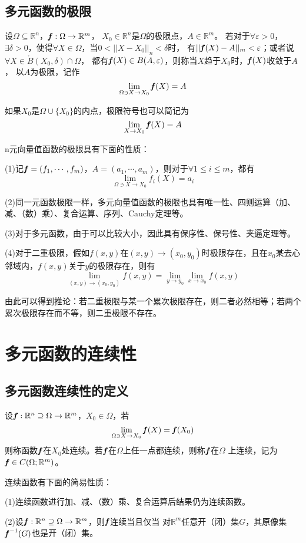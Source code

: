 \documentclass[UTF8,openany]{book}
\begin{document}
	\subsection{多元函数的极限}
	\par 设$\Omega\subseteq\mathbb{R}^n$，$\textbf{\textit{f}}:\Omega\rightarrow\mathbb{R}^m$，
	$X_0\in\mathbb{R}^n$是$\Omega$的极限点，$A\in\mathbb{R}^m$。
	若对于$\forall\varepsilon>0$，$\exists\delta>0$，使得$\forall X\in\Omega$，当$0<||X-X_0||_n<\delta$时，
	有$||\textbf{\textit{f}}(X)-A||_m<\varepsilon$；或者说$\forall X\in\mathring{B}(X_0,\delta)\cap\Omega$，
	都有$\textbf{\textit{f}}(X)\in B(A,\varepsilon)$，则称当$X$趋于$X_0$时，$\textbf{\textit{f}}(X)$收敛于$A$，
	以$A$为极限，记作
	$$\lim_{\Omega\ni X\rightarrow X_0}\textbf{\textit{f}}(X)=A$$
	\par 如果$X_0$是$\Omega\cup\{X_0\}$的内点，极限符号也可以简记为
	$$\lim_{X\rightarrow X_0}\textbf{\textit{f}}(X)=A$$
	\par n元向量值函数的极限具有下面的性质：
	\par (1)记$\textbf{\textit{f}}=(f_1,\cdots,f_m)$，$A=(a_1,\cdots,a_m)$，则对于$\forall 1\leqslant i\leqslant m$，都有
	$$\lim_{\Omega\ni X\rightarrow X_0}f_i(X)=a_i$$
	\par (2)同一元函数极限一样，多元向量值函数的极限也具有唯一性、四则运算（加、减、（数）乘）、复合运算、序列、Cauchy定理等。
	\par (3)对于多元函数，由于可以比较大小，因此具有保序性、保号性、夹逼定理等。
	\par (4)对于二重极限，假如$f(x,y)$在$(x,y)\rightarrow(x_0,y_0)$时极限存在，且在$x_0$某去心邻域内，$f(x,y)$关于$y$的极限存在，则有
	$$\lim_{(x,y)\rightarrow(x_0,y_0)}f(x,y)=\lim_{y\rightarrow y_0}\lim_{x\rightarrow x_0}f(x,y)$$
	\par 由此可以得到推论：若二重极限与某一个累次极限存在，则二者必然相等；若两个累次极限存在而不等，则二重极限不存在。
	\section{多元函数的连续性}
	\subsection{多元函数连续性的定义}
	\par 设$\textbf{\textit{f}}:\mathbb{R}^n\supseteq\Omega\rightarrow\mathbb{R}^m$，$X_0\in\Omega$，若
	$$\lim_{\Omega\ni X\rightarrow X_0}\textbf{\textit{f}}(X)=\textbf{\textit{{f}}}(X_0)$$
	则称函数$\textbf{\textit{f}}$在$X_0$处连续。若$\textbf{\textit{f}}$在$\Omega$上任一点都连续，则称$\textbf{\textit{f}}$在$\Omega$
	上连续，记为$\textbf{\textit{f}}\in C(\Omega;\mathbb{R}^m)$。
	\par 连续函数有下面的简易性质：
	\par (1)连续函数进行加、减、（数）乘、复合运算后结果仍为连续函数。
	\par (2)设$\textbf{\textit{f}}:\mathbb{R}^n\supseteq\Omega\rightarrow\mathbb{R}^m$，则$\textbf{\textit{f}}$连续当且仅当
	对$\mathbb{R}^m$任意开（闭）集$G$，其原像集$\textbf{\textit{f}}^{-1}(G)$也是开（闭）集。
\end{document}
